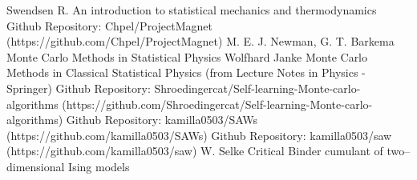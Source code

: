 \begin{thebibliography}{9}
 Swendsen R. An introduction to statistical mechanics and thermodynamics
 Github Repository: Chpel/ProjectMagnet (https://github.com/Chpel/ProjectMagnet)
 M. E. J. Newman, G. T. Barkema Monte Carlo Methods in Statistical Physics
 Wolfhard Janke Monte Carlo Methods in Classical Statistical Physics (from Lecture Notes in Physics - Springer)
 Github Repository: Shroedingercat/Self-learning-Monte-carlo-algorithms (https://github.com/Shroedingercat/Self-learning-Monte-carlo-algorithms)
 Github Repository: kamilla0503/SAWs (https://github.com/kamilla0503/SAWs)
 Github Repository: kamilla0503/saw (https://github.com/kamilla0503/saw)
 W. Selke Critical Binder cumulant of two–dimensional Ising models
\end{thebibliography}